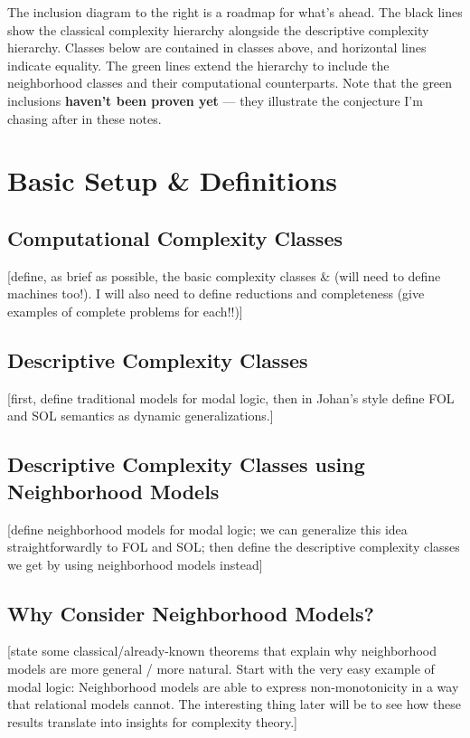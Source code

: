\documentclass[letterpaper]{article}
\begin{document}
The inclusion diagram to the right is a roadmap for what's ahead.  The black lines show the classical complexity hierarchy alongside the descriptive complexity hierarchy.  Classes below are contained in classes above, and horizontal lines indicate equality.  The green lines extend the hierarchy to include the neighborhood classes and their computational counterparts.  Note that the green inclusions \textbf{haven't been proven yet} --- they illustrate the conjecture I'm chasing after in these notes.

\section*{Basic Setup \& Definitions}

\subsection*{Computational Complexity Classes}
[define, as brief as possible, the basic complexity classes \& (will need to define machines too!).  I will also need to define reductions and completeness (give examples of complete problems for each!!)]

\subsection*{Descriptive Complexity Classes}
[first, define traditional models for modal logic, then in Johan's style define FOL and SOL semantics as dynamic generalizations.]

\subsection*{Descriptive Complexity Classes using Neighborhood Models}
[define neighborhood models for modal logic; we can generalize this idea straightforwardly to FOL and SOL; then define the descriptive complexity classes we get by using neighborhood models instead]

\subsection*{Why Consider Neighborhood Models?}
[state some classical/already-known theorems that explain why neighborhood models are more general / more natural. Start with the very easy example of modal logic: Neighborhood models are able to express non-monotonicity in a way that relational models cannot.  The interesting thing later will be to see how these results translate into insights for complexity theory.]
\end{document}
